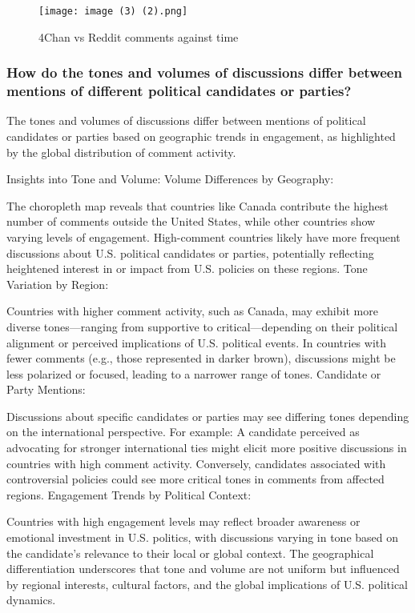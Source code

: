 \documentclass[sigconf]{acmart}
\begin{document}
\begin{figure}
    \centering
    \texttt{[image: image (3) (2).png]}
    \caption{4Chan vs Reddit comments against time}
    \label{fig:enter-label}
\end{figure}

\subsubsection{How do the tones and volumes of discussions differ between
mentions of different political candidates or parties?}
{The tones and volumes of discussions differ between mentions of political candidates or parties based on geographic trends in engagement, as highlighted by the global distribution of comment activity.

Insights into Tone and Volume:
Volume Differences by Geography:

The choropleth map reveals that countries like Canada contribute the highest number of comments outside the United States, while other countries show varying levels of engagement.
High-comment countries likely have more frequent discussions about U.S. political candidates or parties, potentially reflecting heightened interest in or impact from U.S. policies on these regions.
Tone Variation by Region:

Countries with higher comment activity, such as Canada, may exhibit more diverse tones—ranging from supportive to critical—depending on their political alignment or perceived implications of U.S. political events.
In countries with fewer comments (e.g., those represented in darker brown), discussions might be less polarized or focused, leading to a narrower range of tones.
Candidate or Party Mentions:

Discussions about specific candidates or parties may see differing tones depending on the international perspective. For example:
A candidate perceived as advocating for stronger international ties might elicit more positive discussions in countries with high comment activity.
Conversely, candidates associated with controversial policies could see more critical tones in comments from affected regions.
Engagement Trends by Political Context:

Countries with high engagement levels may reflect broader awareness or emotional investment in U.S. politics, with discussions varying in tone based on the candidate's relevance to their local or global context.
The geographical differentiation underscores that tone and volume are not uniform but influenced by regional interests, cultural factors, and the global implications of U.S. political dynamics.}
\end{document}
